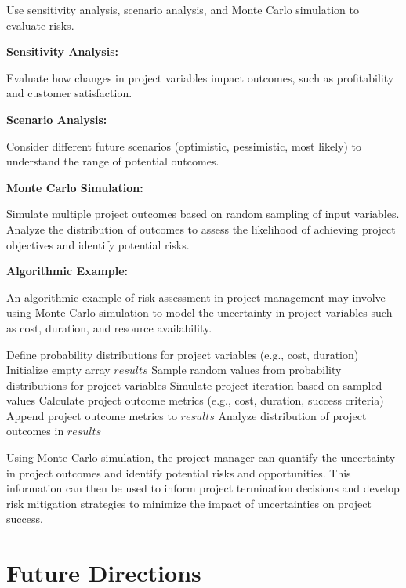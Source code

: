 \documentclass[12pt]{book} %
\begin{document}
Use sensitivity analysis, scenario analysis, and Monte Carlo simulation to evaluate risks.

\textbf{Sensitivity Analysis:}

Evaluate how changes in project variables impact outcomes, such as profitability and customer satisfaction.

\textbf{Scenario Analysis:}

Consider different future scenarios (optimistic, pessimistic, most likely) to understand the range of potential outcomes.

\textbf{Monte Carlo Simulation:}

Simulate multiple project outcomes based on random sampling of input variables. Analyze the distribution of outcomes to assess the likelihood of achieving project objectives and identify potential risks.

\textbf{Algorithmic Example:}

An algorithmic example of risk assessment in project management may involve using Monte Carlo simulation to model the uncertainty in project variables such as cost, duration, and resource availability.
\FloatBarrier
\begin{algorithm}
\caption{Monte Carlo Simulation for Project Risk Assessment}\label{alg:montecarlo}
\begin{algorithmic}[1]
\State Define probability distributions for project variables (e.g., cost, duration)
\State Initialize empty array $results$
    \State Sample random values from probability distributions for project variables
    \State Simulate project iteration based on sampled values
    \State Calculate project outcome metrics (e.g., cost, duration, success criteria)
    \State Append project outcome metrics to $results$
\EndFor
\State Analyze distribution of project outcomes in $results$
\end{algorithmic}
\end{algorithm}
\FloatBarrier
Using Monte Carlo simulation, the project manager can quantify the uncertainty in project outcomes and identify potential risks and opportunities. This information can then be used to inform project termination decisions and develop risk mitigation strategies to minimize the impact of uncertainties on project success.

\section{Future Directions}
\end{document}
